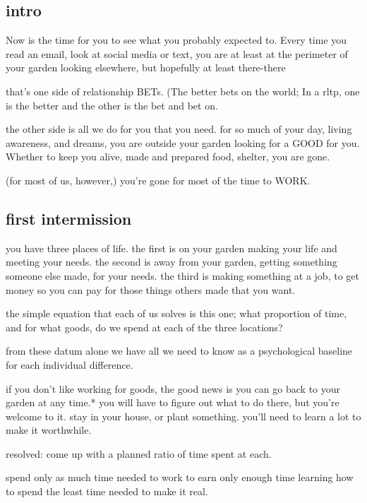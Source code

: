 \documentclass[
]{book}
\begin{document}
\hypertarget{intro}{%
\subsection{intro}\label{intro}}

Now is the time for you to see
what you probably expected to.
Every time you read an email,
look at social media or text,
you are at least at the perimeter of your garden
looking elsewhere,
but hopefully at least there-there

that's one side of
relationship
BETs.
(The better bets on the world;
In a rltp, one is the better and
the other is the bet and bet on.

the other side
is all we do for you
that you need.
for so much of your
day, living awareness,
and dreams,
you are outside your garden
looking for a GOOD
for you.
Whether to keep you alive,
made and prepared food,
shelter,
you are gone.

(for most of us,
however,)
you're gone for most of the time
to WORK.

\hypertarget{first-intermission}{%
\subsection{first intermission}\label{first-intermission}}

you have three places of life.
the first is on your garden
making your life and meeting your needs.
the second is away from your garden,
getting something someone else made,
for your needs.
the third is making something
at a job,
to get money so you can pay
for those things others made
that you want.

the simple equation
that each of us solves
is this one;
what proportion
of time,
and for what goods,
do we spend at each of the three locations?

from these datum alone
we have all we need to know
as a psychological baseline
for each individual difference.

if you don't like
working for goods,
the good news is
you can go back to your garden
at any time.*
you will have to figure out what to do there,
but you're welcome to it.
stay in your house,
or plant something.
you'll need to learn a lot to make it worthwhile.

resolved:
come up with a planned ratio of time
spent at each.

spend only as much time needed
to work to
earn only enough time learning
how to spend the least time needed
to make it real.
\end{document}
